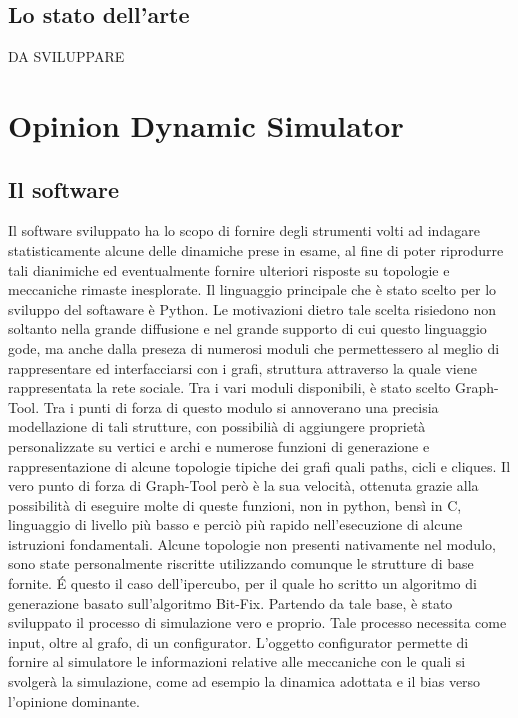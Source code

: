 \documentclass{article}
\begin{document}
\subsection{Lo stato dell'arte}
DA SVILUPPARE 

\section{Opinion Dynamic Simulator}
\subsection{Il software}
Il software sviluppato ha lo scopo di fornire degli strumenti volti ad indagare statisticamente alcune delle dinamiche prese in esame, al fine di poter riprodurre tali dianimiche ed eventualmente fornire ulteriori risposte su topologie e meccaniche rimaste inesplorate.\newline
Il linguaggio principale che è stato scelto per lo sviluppo del softaware è Python. Le motivazioni dietro tale scelta risiedono non soltanto nella grande diffusione e nel grande supporto di cui questo linguaggio gode, ma anche dalla preseza di numerosi moduli che permettessero al meglio di rappresentare ed interfacciarsi con i grafi, struttura attraverso la quale viene rappresentata la rete sociale.
Tra i vari moduli disponibili, è stato scelto Graph-Tool. Tra i punti di forza di questo modulo si annoverano una precisia modellazione di tali strutture, con possibilià di aggiungere proprietà personalizzate su vertici e archi e numerose funzioni di generazione e rappresentazione di alcune topologie tipiche dei grafi quali paths, cicli e cliques. Il vero punto di forza di Graph-Tool però è la sua velocità, ottenuta grazie alla possibilità di eseguire molte di queste funzioni, non in python, bensì in C, linguaggio di livello più basso e perciò più rapido nell'esecuzione di alcune istruzioni fondamentali.\newline
Alcune topologie non presenti nativamente nel modulo, sono state personalmente riscritte utilizzando comunque le strutture di base fornite. É questo il caso dell'ipercubo, per il quale ho scritto un algoritmo di generazione basato sull'algoritmo Bit-Fix.\newline
Partendo da tale base, è stato sviluppato il processo di simulazione vero e proprio. Tale processo necessita come input, oltre al grafo, di un configurator. L'oggetto configurator permette di fornire al simulatore le informazioni relative alle meccaniche con le quali si svolgerà la simulazione, come ad esempio la dinamica adottata e il bias verso l'opinione dominante.\newline 
\end{document}
